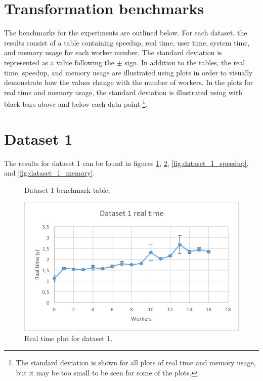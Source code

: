 \section{Transformation benchmarks}
The benchmarks for the experiments are outlined below. For each dataset, the results consist of a table containing
speedup, real time, user time, system time, and memory usage for each worker number. The standard deviation is represented
as a value following the $\pm$ sign. In addition to the tables, the real time, speedup, and memory usage are illustrated
using plots in order to visually demonstrate how the values change with the number of workers. In the plots for real time
and memory usage, the standard deviation is illustrated using with black bars above and below each data point
\footnote{The standard deviation is shown for all plots of real time and memory usage, but it may be too small to be seen for
some of the plots.}. 

\section{Dataset 1}
The results for dataset 1 can be found in figures \ref{fig:dataset_1_table}, \ref{fig:dataset_1_real_time}, \ref{fig:dataset_1_speedup}, and \ref{fig:dataset_1_memory}.

\begin{figure}[ht]
\centering
{}
\caption[Dataset 1 benchmark table.]{Dataset 1 benchmark table.}
\label{fig:dataset_1_table}
\end{figure}

\begin{figure}[ht]
  \centering
  \includegraphics[width=120mm]{figures/dataset_1/dataset_1_real_time.png}
  \caption[Real time plot for dataset 1.]{Real time plot for dataset 1.}
  \label{fig:dataset_1_real_time}
\end{figure}

